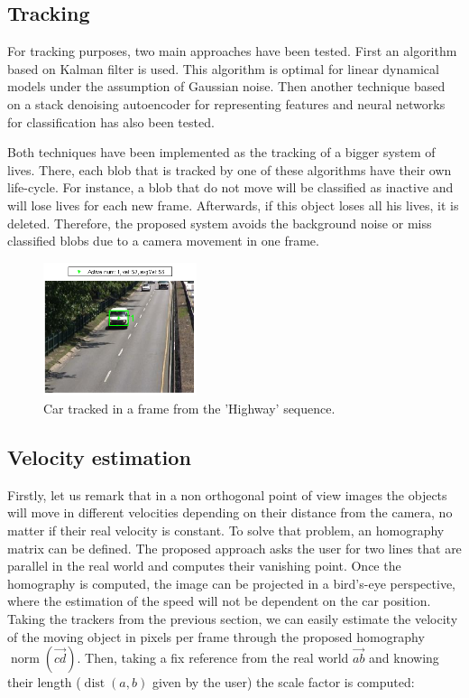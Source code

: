 \documentclass{article}
\begin{document}
\subsection{Tracking}

For tracking purposes, two main approaches have been tested. First an algorithm based on Kalman filter \cite{kalman1960new} is used. This algorithm is optimal for linear dynamical models under the assumption of Gaussian noise. Then another technique based on a stack denoising autoencoder for representing features and neural networks for classification \cite{wang2013nips} has also been tested.

Both techniques have been implemented as the tracking of a bigger system of lives. There, each blob that is tracked by one of these algorithms have their own life-cycle. For instance, a blob that do not move will be classified as inactive and will lose lives for each new frame. Afterwards, if this object loses all his lives, it is deleted. Therefore, the proposed system avoids the background noise or miss classified blobs due to a camera movement in one frame.

\begin{figure}[!htb]
	\centering
	\includegraphics[width=0.4\textwidth]{fig/traker_car}
    \caption{Car tracked in a frame from the 'Highway' sequence.}
    \label{f:trackcar}
\end{figure}

\subsection{Velocity estimation} 
\label{subsec:vel}

Firstly, let us remark that in a non orthogonal point of view images the objects will move in different velocities depending on their distance from the camera, no matter if their real velocity is constant. To solve that problem, an homography matrix can be defined. The proposed approach asks the user for two lines that are parallel in the real world and computes their vanishing point. Once the homography is computed, the image can be projected in a bird's-eye perspective, where the estimation of the speed will not be dependent on the car position. Taking the trackers from the previous section, we can easily estimate the velocity of the moving object in pixels per frame through the proposed homography \(\operatorname{norm}(\vec{cd})\). Then, taking a fix reference from the real world \(\vec{ab}\) and knowing their length (\(\operatorname{dist}(a,b)\) given by the user) the scale factor is computed:
\end{document}
